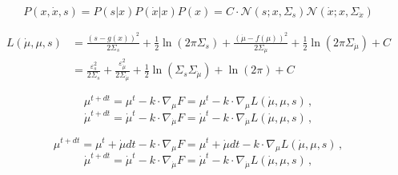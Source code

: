 \documentclass[a4paper, 10pt]{article}
\begin{document}
\begin{equation}
P(x, \dot{x}, s) = P(s|x) P(\dot{x}|x) P(x) = C \cdot \mathcal{N}(s;x,\Sigma_s) \mathcal{N}(\dot{x};x,\Sigma_{\dot{x}})
\end{equation}

\begin{equation}
\begin{split}
L(\dot{\mu}, \mu, s) &=  \frac{(s-g(x))^2}{2 \Sigma_{s}} + \frac{1}{2} \ln (2 \pi \Sigma_{s})+ \frac{(\dot{\mu}-f(\mu))^2}{2 \Sigma_{\dot{\mu}}} + \frac{1}{2} \ln (2 \pi \Sigma_{\dot{\mu}}) + C \\
	&= \frac{\varepsilon_{s}^2}{2 \Sigma_{s}} + \frac{\varepsilon_{\dot{\mu}}^2}{2 \Sigma_{\dot{\mu}}} + \frac{1}{2} \ln (\Sigma_{s}\Sigma_{\dot{\mu}}) + \ln(2 \pi) + C
\end{split}
\end{equation}


\begin{equation}
\mu^{t+dt} = \mu^{t} - k \cdot \nabla_{\mu} F = \mu^{t} - k \cdot \nabla_{\mu} L(\dot{\mu}, \mu, s) \, ,
\end{equation}
\begin{equation}
\dot{\mu}^{t+dt} = \dot{\mu}^{t} - k \cdot \nabla_{\dot{\mu}} F = \dot{\mu}^{t} - k \cdot \nabla_{\dot{\mu}} L(\dot{\mu}, \mu, s) \, ,
\end{equation}


\begin{equation}
\mu^{t+dt} = \mu^{t} + \dot{\mu} dt - k \cdot \nabla_{\mu} F = \mu^{t} + \dot{\mu} dt - k \cdot \nabla_{\mu} L(\dot{\mu}, \mu, s) \, ,
\end{equation}
\begin{equation}
\dot{\mu}^{t+dt} = \dot{\mu}^{t} - k \cdot \nabla_{\dot{\mu}} F = \dot{\mu}^{t} - k \cdot \nabla_{\dot{\mu}} L(\dot{\mu}, \mu, s) \, ,
\end{equation}


\newpage
\end{document}
